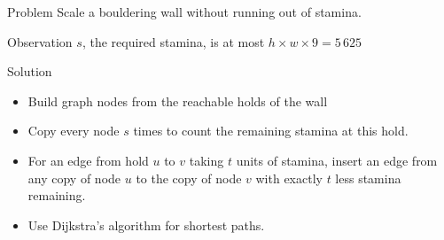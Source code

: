 \begin{slide}
  \begin{block}{Problem}
    Scale a bouldering wall without running out of stamina.
  \end{block}
  \pause
  \begin{block}{Observation}
    $s$, the required stamina, is at most $h \times w \times 9 = 5\,625$
  \end{block}
\end{slide} 

\begin{slide}
  \begin{block}{Solution}
  \begin{itemize}
    \item Build graph nodes from the reachable holds of the wall
    \item Copy every node $s$ times to count the remaining stamina at this hold.
    \item For an edge from hold $u$ to $v$ taking $t$ units of stamina,
          insert an edge from any copy of node $u$ to the copy of node $v$ with
          exactly $t$ less stamina remaining.  
    \item Use Dijkstra's algorithm for shortest paths.
  \end{itemize}
\end{block}
\end{slide}
